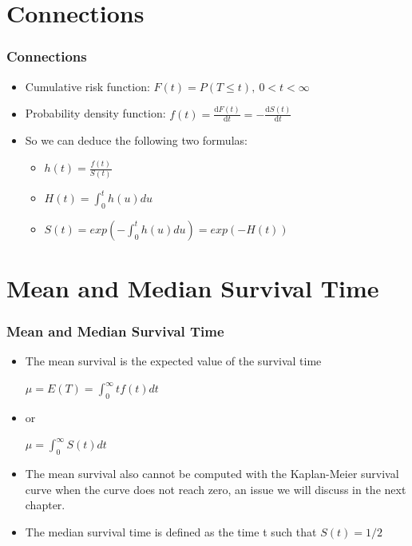 \documentclass{beamer}
\newcommand{\dif}{\mathrm{d}}
\begin{document}
\section{Connections}
\begin{frame}
\frametitle{Connections}
\begin{itemize}
\item Cumulative risk function: $F(t) =  P (T\le t),\   0<t<\infty$
\item Probability density function: $f(t) = \frac{\dif F(t)}{\dif t} =  - \frac{\dif S(t)}{\dif t}$
\item So we can deduce the following two formulas:
\begin{itemize}
	\item $h(t) = \frac{f(t)}{S(t)} $
	\item $H(t) = \int_{0}^{t} h(u) du$ 
	\item $S(t) = exp(- \int_{0}^{t} h(u) du) = exp(-H(t))$
	\end{itemize}
\end{itemize}
\end{frame}


\section{Mean and Median Survival Time}
\begin{frame}
\frametitle{Mean and Median Survival Time}
\begin{itemize}	
\item The {\color{red}mean} survival is the expected value of the survival time \linebreak
\centerline{$\mu = E(T) =\int_{0}^{\infty} tf(t) dt $}

\item or \linebreak
\centerline{$\mu =\int_{0}^{\infty} S(t) dt $}

\item The mean survival also cannot be computed with the {\color{red}Kaplan-Meier survival curve} when the curve does not reach zero, an issue we will discuss in the next chapter.

\item The median survival time is defined as the time t such that $S(t) = 1/2$
\end{itemize}
\end{frame}
\end{document}
